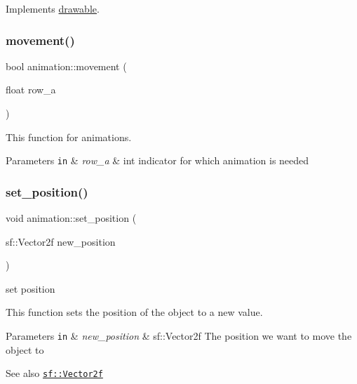 Implements \hyperlink{classdrawable_ae013ac0be47538be9ce885d6642daf73}{drawable}.

\mbox{\label{classanimation_a79260eb98a4f77aa4b9f3b08cc8e5b59}} 
\subsubsection{\texorpdfstring{movement()}{movement()}}
{\footnotesize\ttfamily bool animation\+::movement (\begin{DoxyParamCaption}\item[{float}]{row\+\_\+a }\end{DoxyParamCaption})}



This function for animations. 


\begin{DoxyParams}[1]{Parameters}
\mbox{\tt in}  & {\em row\+\_\+a} & int indicator for which animation is needed \\
\hline
\end{DoxyParams}
\mbox{\label{classanimation_ac461adb38b8241427150c4620ee31358}} 
\subsubsection{\texorpdfstring{set\+\_\+position()}{set\_position()}}
{\footnotesize\ttfamily void animation\+::set\+\_\+position (\begin{DoxyParamCaption}\item[{sf\+::\+Vector2f}]{new\+\_\+position }\end{DoxyParamCaption})}



set position 

This function sets the position of the object to a new value.


\begin{DoxyParams}[1]{Parameters}
\mbox{\tt in}  & {\em new\+\_\+position} & sf\+::\+Vector2f The position we want to move the object to \\
\hline
\end{DoxyParams}
\begin{DoxySeeAlso}{See also}
\href{https://www.sfml-dev.org/documentation/2.0/classsf_1_1Vector2.php }{\tt sf\+::\+Vector2f} 
\end{DoxySeeAlso}
\mbox{\label{classanimation_a7c0b874294e81f3612590920fd845602}} 

